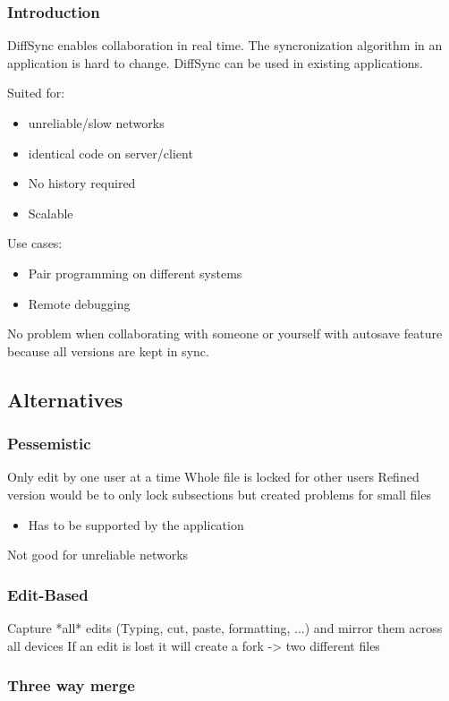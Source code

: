 \subsubsection{Introduction}
DiffSync enables collaboration in real time.
The syncronization algorithm in an application is hard to change.
DiffSync can be used in existing applications.

Suited for:
\begin{itemize}
    \item unreliable/slow networks
    \item identical code on server/client
    \item No history required
    \item Scalable
\end{itemize}

Use cases:
\begin{itemize}
\item Pair programming on different systems
\item Remote debugging 
\end{itemize}

No problem when collaborating with someone or yourself with autosave feature because all versions are kept in sync.

\subsection{Alternatives}

\subsubsection{Pessemistic}
Only edit by one user at a time
Whole file is locked for other users
Refined version would be to only lock subsections but created problems for small files
\begin{itemize}
    \item Has to be supported by the application
\end{itemize}
Not good for unreliable networks

\subsubsection{Edit-Based}
Capture *all* edits (Typing, cut, paste, formatting, ...) and mirror them across all devices
If an edit is lost it will create a fork -> two different files

\subsubsection{Three way merge}

